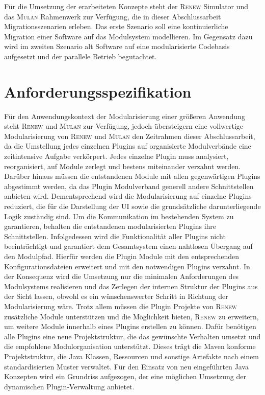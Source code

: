 	Für die Umsetzung der erarbeiteten Konzepte steht der \textsc{Renew} Simulator und das \textsc{Mulan} Rahmenwerk zur Verfügung, die in dieser Abschlussarbeit Migrationsszenarien erleben.\newline 
	Das erste Szenario soll eine kontinuierliche Migration einer Software auf das Modulsystem modellieren. Im Gegensatz dazu wird im zweiten Szenario alt Software auf eine modularisierte Codebasis aufgesetzt und der parallele Betrieb begutachtet. 

\section{Anforderungsspezifikation} 
	Für den Anwendungskontext der Modularisierung einer größeren Anwendung steht \textsc{Renew} und \textsc{Mulan} zur Verfügung, jedoch übersteigern eine vollwertige Modularisierung von \textsc{Renew} und \textsc{Mulan} den Zeitrahmen dieser Abschlussarbeit, da die Umstellung jedes einzelnen Plugins auf organisierte Modulverbände eine zeitintensive Aufgabe verkörpert. Jedes einzelne Plugin muss analysiert, reorganisiert, auf Module zerlegt und bestens miteinander verzahnt werden. Darüber hinaus müssen die entstandenen Module mit allen gegenwärtigen Plugins abgestimmt werden, da das Plugin Modulverband generell andere Schnittstellen anbieten wird. \bigbreak
	Dementsprechend wird die Modularisierung auf einzelne Plugins reduziert, die für die Darstellung der UI sowie die grundsätzliche darunterliegende Logik zuständig sind. Um die Kommunikation im bestehenden System zu garantieren, behalten die entstandenen modularisierten Plugins ihre Schnittstellen. Infolgedessen wird die Funktionalität aller Plugins nicht beeinträchtigt und garantiert dem Gesamtsystem einen nahtlosen Übergang auf den Modulpfad. Hierfür werden die Plugin Module mit den entsprechenden Konfigurationsdateien erweitert und mit den notwendigen Plugins verzahnt. In der Konsequenz wird die Umsetzung nur die minimalen Anforderungen des Modulsystems realisieren und das Zerlegen der internen Struktur der Plugins aus der Sicht lassen, obwohl es ein wünschenswerter Schritt in Richtung der Modularisierung wäre. \newline 
	Trotz allem müssen die Plugin Projekte von \textsc{Renew} zusätzliche Module unterstützen und die Möglichkeit bieten, \textsc{Renew} zu erweitern, um weitere Module innerhalb eines Plugins erstellen zu können. Dafür benötigen alle Plugins eine neue Projektstruktur, die das gewünschte Verhalten umsetzt und die empfohlene Modulorganisation unterstützt. Dieses trägt die Maven konforme Projektstruktur, die Java Klassen, Ressourcen und sonstige Artefakte nach einem standardisierten Muster verwaltet.\newline
	Für den Einsatz von neu eingeführten Java Konzepten wird ein Grundriss aufgezogen, der eine möglichen Umsetzung der dynamischen Plugin-Verwaltung anbietet. \bigbreak

